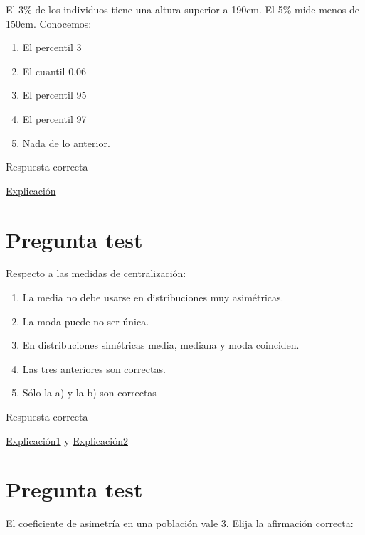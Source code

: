 \documentclass[
]{book}
\providecommand{\tightlist}{%
  \setlength{\itemsep}{0pt}\setlength{\parskip}{0pt}}
\begin{document}
El 3\% de los individuos tiene una altura superior a 190cm. El 5\% mide menos de 150cm. Conocemos:

\begin{enumerate}
\def\labelenumi{\alph{enumi})}
\tightlist
\item
  El percentil 3
\item
  El cuantil 0,06
\item
  El percentil 95
\item
  El percentil 97
\item
  Nada de lo anterior.
\end{enumerate}

Respuesta correcta

\href{https://1fjmanzano.github.io/bioestadistica/medidas-de-posicio\%CC\%81n-dispersio\%CC\%81n-y-forma.html\#medidas-de-posicio\%CC\%81n-no-centrales}{Explicación}

\hypertarget{pregunta-test-56}{%
\section{Pregunta test}\label{pregunta-test-56}}

Respecto a las medidas de centralización:

\begin{enumerate}
\def\labelenumi{\alph{enumi})}
\tightlist
\item
  La media no debe usarse en distribuciones muy asimétricas.
\item
  La moda puede no ser única.
\item
  En distribuciones simétricas media, mediana y moda coinciden.
\item
  Las tres anteriores son correctas.
\item
  Sólo la a) y la b) son correctas
\end{enumerate}

Respuesta correcta

\href{https://1fjmanzano.github.io/bioestadistica/medidas-de-forma.html}{Explicación1} y \href{https://www.statisticshowto.com/what-is-a-bimodal-distribution/}{Explicación2}

\hypertarget{pregunta-test-57}{%
\section{Pregunta test}\label{pregunta-test-57}}

El coeficiente de asimetría en una población vale 3. Elija la afirmación correcta:
\end{document}
